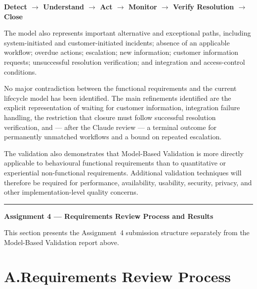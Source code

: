 \documentclass[11pt,a4paper]{article}
\begin{document}
\begin{center}
\textbf{Detect $\rightarrow$ Understand $\rightarrow$ Act $\rightarrow$ Monitor $\rightarrow$ Verify Resolution $\rightarrow$ Close}
\end{center}

The model also represents important alternative and exceptional paths, including system-initiated and customer-initiated incidents; absence of an applicable workflow; overdue actions; escalation; new information; customer information requests; unsuccessful resolution verification; and integration and access-control conditions.

No major contradiction between the functional requirements and the current lifecycle model has been identified. The main refinements identified are the explicit representation of waiting for customer information, integration failure handling, the restriction that closure must follow successful resolution verification, and — after the Claude review — a terminal outcome for permanently unmatched workflows and a bound on repeated escalation.

The validation also demonstrates that Model-Based Validation is more directly applicable to behavioural functional requirements than to quantitative or experiential non-functional requirements. Additional validation techniques will therefore be required for performance, availability, usability, security, privacy, and other implementation-level quality concerns.

\vspace{6pt}\hrule\vspace{8pt}

{\centering\large\bfseries Assignment 4 — Requirements Review Process and Results\par}
\vspace{6pt}

This section presents the Assignment~4 submission structure separately from the Model-Based Validation report above.

\section*{A.\enspace Requirements Review Process}
\end{document}
